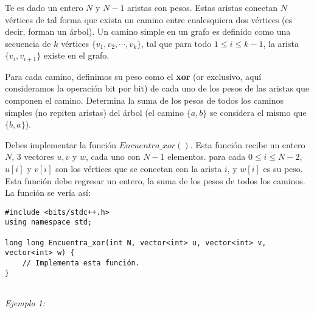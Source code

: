 \documentclass[12pt]{scrartcl}
\begin{document}
    
    
    \vspace{10pt}

    
    
        Te es dado un entero $N$ y $N - 1$ aristas con pesos. Estas aristas conectan $N$ vértices de tal forma que exista un camino entre cualesquiera dos vértices (es decir, forman un árbol).
        Un camino simple en un grafo es definido como una secuencia de $k$ vértices $\{v_1, v_2, \cdots , v_k\}$, tal que para todo $1 \le i \le k - 1$, la arista $\{v_i, v_{i + 1}\}$ existe en el grafo. 
        
        Para cada camino, definimos su peso como el {\bfseries xor} (or exclusivo, aquí consideramos la operación bit por bit) de cada uno de los pesos de las aristas que componen el camino. Determina la suma de los pesos de todos los caminos simples (no repiten aristas) del árbol (el camino $\{a, b\}$ se considera el mismo que $\{b, a\}$).
        

        Debes implementar la función $Encuentra\_xor()$. Esta función recibe un entero $N$, 3 vectores $u, v$ y $w$, cada uno con $N - 1$ elementos. para cada $0 \le i \le N - 2$, $u[i]$ y $v[i]$ son los vértices que se conectan con la arista $i$, y $w[i]$ es su peso. Esta función debe regresar un entero, la suma de los pesos de todos los caminos.
        La función se vería así:

\begin{verbatim}
#include <bits/stdc++.h>
using namespace std;

long long Encuentra_xor(int N, vector<int> u, vector<int> v, vector<int> w) {
    // Implementa esta función.
}
    
\end{verbatim}


               
        {\itshape Ejemplo 1:}
        
\end{document}
